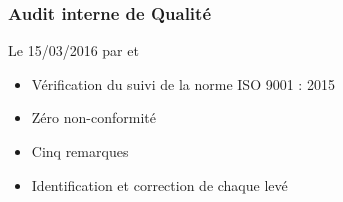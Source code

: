 \begin{frame}
\frametitle{Audit interne de Qualité}
\begin{block}{Le 15/03/2016 par \nomApprobateur{} et \nomTuteurQualite{}}
\begin{itemize}
\item Vérification du suivi de la norme ISO 9001 : 2015
\item Zéro non-conformité
\item Cinq remarques
\item Identification et correction de chaque \FT{} levé
\end{itemize}
\end{block}
\end{frame}





